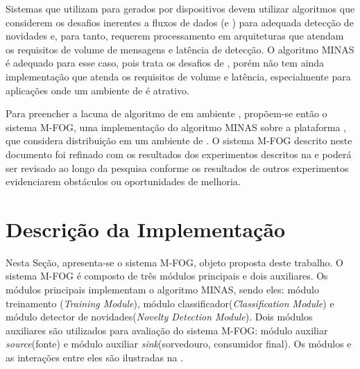 Sistemas que utilizam \nd para \streams gerados por dispositivos \iot devem
utilizar algoritmos que considerem os desafios inerentes a fluxos de dados
(\evolution e \drift) para adequada detecção de novidades e, para tanto,
requerem processamento em arquiteturas
que atendam os requisitos de volume de mensagens e latência de detecção.
O algoritmo MINAS é adequado para esse caso, pois trata os desafios de
\streamMining, porém não tem ainda implementação que atenda os requisitos de
volume e latência, especialmente para aplicações \iot onde um ambiente de \fog é
atrativo.

\newcommand{\mfog}{sistema M-FOG\xspace}


Para preencher a lacuna de algoritmo de \nd em ambiente \fog, propõem-se então
o \mfog, uma implementação do algoritmo MINAS sobre a plataforma \flink, que
considera distribuição em um ambiente de \fog.
O \mfog descrito neste documento foi refinado com os resultados dos experimentos
descritos na  e poderá ser revisado ao longo da pesquisa
conforme os resultados de outros experimentos evidenciarem obstáculos ou
oportunidades de melhoria.


\section{Descrição da Implementação}\label{sec:descricao}

\newcommand{\source}{módulo auxiliar \emph{source}\xspace}
\newcommand{\sink}{módulo auxiliar \emph{sink}\xspace}

\newcommand{\offline}{módulo treinamento\xspace}
\newcommand{\classify}{módulo classificador\xspace}
\newcommand{\detector}{módulo detector de novidades\xspace}

Nesta Seção, apresenta-se o \mfog, objeto proposta deste trabalho.
O \mfog é composto de três módulos principais e dois auxiliares.
Os módulos principais implementam o algoritmo MINAS, sendo eles: \offline
(\emph{Training Module}), \classify (\emph{Classification Module}) e
\detector (\emph{Novelty Detection Module}).
Dois módulos auxiliares são utilizados para avaliação do \mfog:
\source (fonte) e \sink (sorvedouro, consumidor final).
Os módulos e as interações entre eles são ilustradas na .

